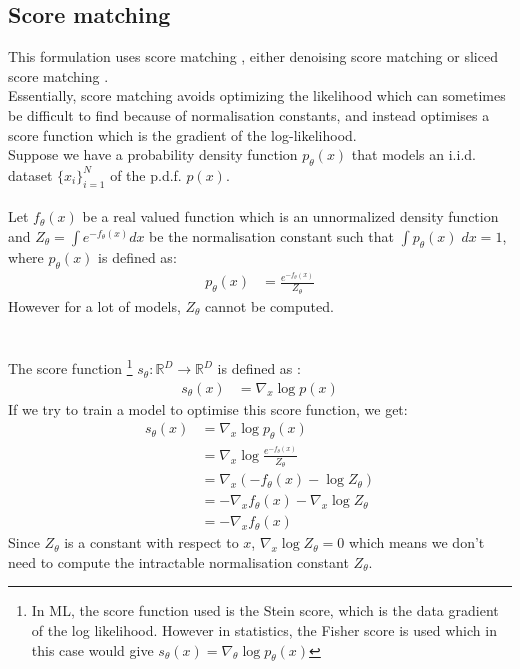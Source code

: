 \documentclass[twoside]{article}
\numberwithin{equation}{section}
\numberwithin{figure}{section}
\begin{document}
\subsection{Score matching}
This formulation uses score matching \cite{hyvarinen2005}, either denoising score matching \cite{vincent2010denoising} or sliced score matching \cite{song2019sliced}. \\
Essentially, score matching avoids optimizing the likelihood which can sometimes be difficult to find because of normalisation constants, and instead optimises a score function which is the gradient of the log-likelihood. \\
Suppose we have a probability density function $p_\theta (x)$ that models an i.i.d. dataset $\{x_i\}_{i=1}^N$ of the p.d.f. $p(x)$. 
\\\\
Let $f_\theta (x)$ be a real valued function which is an unnormalized density function and $Z_\theta = \int e^{-f_\theta (x)} dx$ be the normalisation constant such that $\int p_\theta (x) \; dx = 1$, where $p_\theta(x)$ is defined as:
\begin{align}
  p_\theta (x) &= \frac{e^{-f_\theta (x)}}{Z_\theta}
\end{align}
However for a lot of models, $Z_\theta$ cannot be computed. \cite{luo2022understanding} \\
\\\\
The score function \footnote{In ML, the score function used is the Stein score, which is the data gradient of the log likelihood. However in statistics, the Fisher score is used which in this case would give $s_\theta (x) = \nabla_\theta \log p_\theta (x)$ } $s_\theta : \mathbb{R}^D \rightarrow \mathbb{R}^D$ is defined as  \cite{song2020generative}: 
\begin{align}
  s_\theta (x) &= \nabla_x \log p(x)
\end{align}
If we try to train a model to optimise this score function, we get:
\begin{align}
  s_\theta (x) &= \nabla_x \log p_\theta(x) \\
  &= \nabla_x \log \frac{e^{-f_\theta (x)}}{Z_\theta} \\
  &= \nabla_x \left( -f_\theta (x) - \log Z_\theta \right) \\
  &= - \nabla_x f_\theta (x) - \nabla_x \log Z_\theta \\
  &= - \nabla_x f_\theta (x)
\end{align}
Since $Z_\theta$ is a constant with respect to $x$, $\nabla_x \log Z_\theta = 0$ which means we don't need to compute the intractable normalisation constant $Z_\theta$. \\
\end{document}
